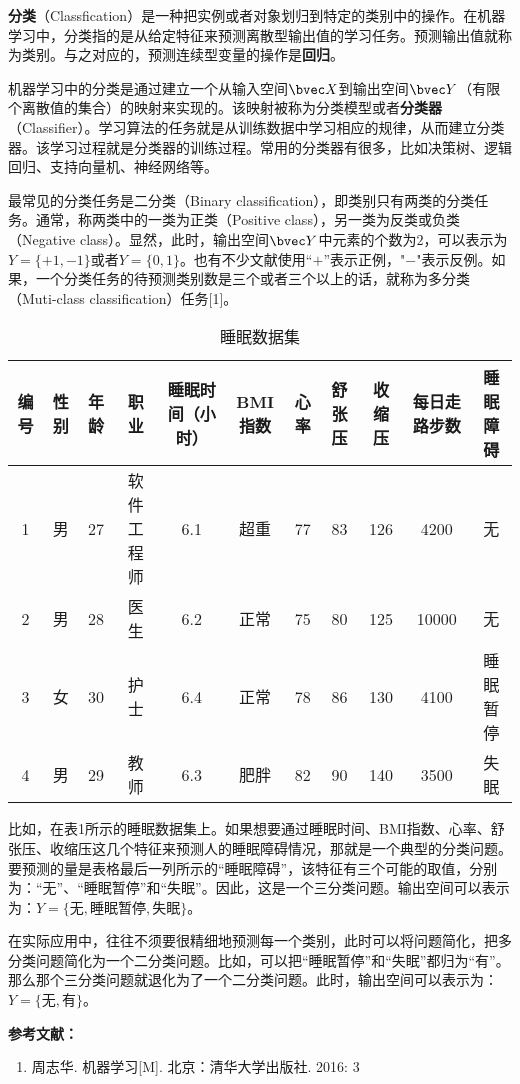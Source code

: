 

\textbf{分类}（Classfication）是一种把实例或者对象划归到特定的类别中的操作。在机器学习中，分类指的是从给定特征来预测离散型输出值的学习任务。预测输出值就称为类别。与之对应的，预测连续型变量的操作是\textbf{回归}。

机器学习中的分类是通过建立一个从输入空间$\bvec X$到输出空间$\bvec Y$（有限个离散值的集合）的映射来实现的。该映射被称为分类模型或者\textbf{分类器}（Classifier）。学习算法的任务就是从训练数据中学习相应的规律，从而建立分类器。该学习过程就是分类器的训练过程。常用的分类器有很多，比如决策树、逻辑回归、支持向量机、神经网络等。

最常见的分类任务是二分类（Binary classification），即类别只有两类的分类任务。通常，称两类中的一类为正类（Positive class），另一类为反类或负类（Negative class）。显然，此时，输出空间$\bvec Y$中元素的个数为$2$，可以表示为$Y=\{+1, -1\}$或者$Y=\{0, 1\}$。也有不少文献使用“$+$”表示正例，"$-$"表示反例。如果，一个分类任务的待预测类别数是三个或者三个以上的话，就称为多分类（Muti-class classification）任务[1]。

\begin{table}[ht]
\centering
\caption{睡眠数据集}\label{tab_Class1}
\begin{tabular}{|c|c|c|c|c|c|c|c|c|c|c|}
\hline
编号 & 性别 & 年龄 & 职业 & 睡眠时间（小时） & BMI指数 & 心率 & 舒张压 & 收缩压 & 每日走路步数 & 睡眠障碍 \\\hline
1 & 男 & 27 & 软件工程师 & 6.1 & 超重 & 77 & 83 & 126 & 4200 & 无 \\
\hline
2 & 男 & 28 & 医生 & 6.2 & 正常 & 75 & 80 & 125 & 10000 & 无 \\
\hline
3 & 女 & 30 & 护士 & 6.4 & 正常 & 78 & 86 & 130 & 4100 & 睡眠暂停 \\
\hline
4 & 男 & 29 & 教师 & 6.3 & 肥胖 & 82 & 90 & 140 & 3500 & 失眠 \\
\hline
\end{tabular}
\end{table}

比如，在表1所示的睡眠数据集上。如果想要通过睡眠时间、BMI指数、心率、舒张压、收缩压这几个特征来预测人的睡眠障碍情况，那就是一个典型的分类问题。要预测的量是表格最后一列所示的“睡眠障碍”，该特征有三个可能的取值，分别为：“无”、“睡眠暂停”和“失眠”。因此，这是一个三分类问题。输出空间可以表示为：$Y=\{\text{无}, \text{睡眠暂停}, \text{失眠}\}$。

在实际应用中，往往不须要很精细地预测每一个类别，此时可以将问题简化，把多分类问题简化为一个二分类问题。比如，可以把“睡眠暂停”和“失眠”都归为“有”。那么那个三分类问题就退化为了一个二分类问题。此时，输出空间可以表示为：$Y=\{\text{无}, \text{有}\}$。



\textbf{参考文献：}
\begin{enumerate}
\item 周志华. 机器学习[M]. 北京：清华大学出版社. 2016: 3
\end{enumerate}
